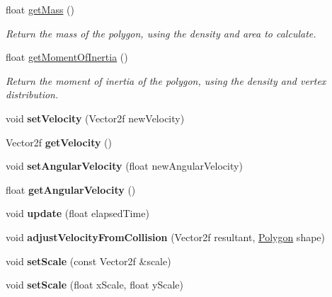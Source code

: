 \begin{DoxyCompactItemize}
float \mbox{\hyperlink{class_polygon_a9c5d5b2df7caf0dc80b00fbcae0a74e2}{get\+Mass}} ()
\begin{DoxyCompactList}\small\item\em Return the mass of the polygon, using the density and area to calculate. \end{DoxyCompactList}\item 
float \mbox{\hyperlink{class_polygon_af029d3b7c0e523ab07b376a193b6c7a3}{get\+Moment\+Of\+Inertia}} ()
\begin{DoxyCompactList}\small\item\em Return the moment of inertia of the polygon, using the density and vertex distribution. \end{DoxyCompactList}\item 
\mbox{\label{class_polygon_ae404b76af51f552e3bc9dc57ea1d8985}} 
void {\bfseries set\+Velocity} (Vector2f new\+Velocity)
\item 
\mbox{\label{class_polygon_a82909752be649f103b26657aae3ff0c9}} 
Vector2f {\bfseries get\+Velocity} ()
\item 
\mbox{\label{class_polygon_a9444a506f5e33f11772854396e1aae0e}} 
void {\bfseries set\+Angular\+Velocity} (float new\+Angular\+Velocity)
\item 
\mbox{\label{class_polygon_a1c28d47f1c0f779cfd5ef31815046a6f}} 
float {\bfseries get\+Angular\+Velocity} ()
\item 
\mbox{\label{class_polygon_a556290c37a29ce71f8488a75509b56af}} 
void {\bfseries update} (float elapsed\+Time)
\item 
\mbox{\label{class_polygon_aeb1576854a28a02afaa636aadf31b992}} 
void {\bfseries adjust\+Velocity\+From\+Collision} (Vector2f resultant, \mbox{\hyperlink{class_polygon}{Polygon}} shape)
\item 
\mbox{\label{class_polygon_aacc719afa9e8befd7ab7ba5ea3eb4d24}} 
void {\bfseries set\+Scale} (const Vector2f \&scale)
\item 
\mbox{\label{class_polygon_a1454b2d9f4ca39f627ea6c54a26a3287}} 
void {\bfseries set\+Scale} (float x\+Scale, float y\+Scale)

\end{DoxyCompactItemize}
